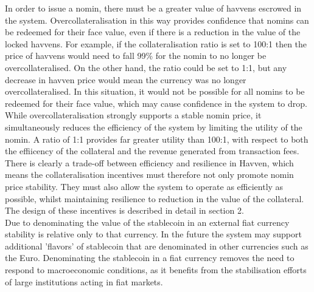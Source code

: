 
\noindent In order to issue a nomin, there must be a greater value of havvens escrowed in the system. Overcollateralisation in this way provides confidence that nomins can be redeemed for their face value, even if there is a reduction in the value of the locked havvens. For example, if the collateralisation ratio is set to 100:1 then the price of havvens would need to fall 99\% for the nomin to no longer be overcollateralised. On the other hand, the ratio could be set to 1:1, but any decrease in havven price would mean the currency was no longer overcollateralised. In this situation, it would not be possible for all nomins to be redeemed for their face value, which may cause confidence in the system to drop.  \\

\noindent While overcollateralisation strongly supports a stable nomin price, it simultaneously reduces the efficiency of the system by limiting the utility of the nomin. A ratio of 1:1 provides far greater utility than 100:1, with respect to both the effiicency of the collateral and the revenue generated from transaction fees. There is clearly a trade-off between efficiency and resilience in Havven, which means the collateralisation incentives must therefore not only promote nomin price stability. They must also allow the system to operate as efficiently as possible, whilst maintaining resilience to reduction in the value of the collateral. The design of these incentives is described in detail in section 2. \\

\noindent Due to denominating the value of the stablecoin in an external fiat currency stability is relative only to that currency. In the future the system may support additional 'flavors' of stablecoin that are denominated in other currencies such as the Euro. Denominating the stablecoin in a fiat currency removes the need to respond to macroeconomic conditions, as it benefits from the stabilisation efforts of large institutions acting in fiat markets. \\

\pagebreak
